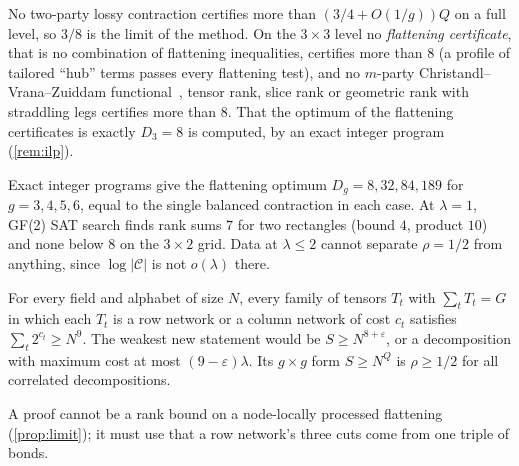 \documentclass[10pt]{amsart}
\theoremstyle{plain}
\theoremstyle{definition}
\theoremstyle{remark}
\numberwithin{equation}{section}
\begin{document}
\begin{proposition}\label{prop:limit}
No two-party lossy contraction certifies more than $(3/4+O(1/g))Q$ on a full level, so $3/8$ is the
limit of the method. On the $3\times3$ level no \emph{flattening certificate}, that is no combination of
flattening inequalities, certifies more than $8$ (a profile of tailored ``hub'' terms passes every
flattening test), and no $m$-party Christandl--Vrana--Zuiddam functional~\cite{CVZ23}, tensor rank,
slice rank or geometric rank with straddling legs certifies more than $8$. That the optimum of the
flattening certificates is exactly $D_3=8$ is computed, by an exact integer program (\cref{rem:ilp}).
\end{proposition}

\begin{remark}\label{rem:ilp}
Exact integer programs give the flattening optimum $D_g=8,32,84,189$ for $g=3,4,5,6$, equal to the
single balanced contraction in each case. At $\lambda=1$, GF(2) SAT search finds rank sums $7$ for two
rectangles (bound $4$, product $10$) and none below $8$ on the $3\times2$ grid. Data at $\lambda\le2$
cannot separate $\rho=1/2$ from anything, since $\log|\mathcal C|$ is not $o(\lambda)$ there.
\end{remark}

\begin{conjecture}\label{conj:N9}
For every field and alphabet of size $N$, every family of tensors $T_t$ with $\sum_tT_t=G$ in which each
$T_t$ is a row network or a column network of cost $c_t$ satisfies $\sum_t2^{c_t}\ge N^9$. The weakest
new statement would be $S\ge N^{8+\varepsilon}$, or a decomposition with maximum cost at most
$(9-\varepsilon)\lambda$. Its $g\times g$ form $S\ge N^Q$ is $\rho\ge1/2$ for all correlated decompositions.
\end{conjecture}

\noindent A proof cannot be a rank bound on a node-locally processed flattening (\cref{prop:limit}); it
must use that a row network's three cuts come from one triple of bonds.
\end{document}
